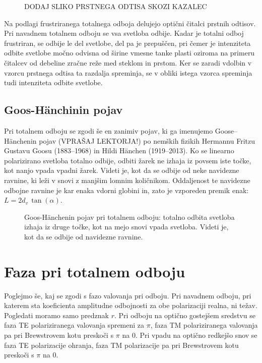 \begin{figure}[ht]
\centering
\caption{DODAJ SLIKO PRSTNEGA ODTISA SKOZI KAZALEC}
\label{fig:04_TunelFoto}
\end{figure}

\begin{remark}
Na podlagi frustriranega totalnega odboja delujejo optični čitalci prstnih odtisov. Pri 
navadnem totalnem odboju se vsa svetloba odbije. Kadar je totalni odboj frustriran, se 
odbije le del svetlobe, del pa je prepuščen, pri čemer je intenziteta odbite
svetlobe močno odvisna od širine vmesne tanke plasti oziroma na primeru čitalcev 
od debeline zračne reže med steklom in prstom. Ker se zaradi vdolbin v vzorcu prstnega odtisa
ta razdalja spreminja, se v obliki istega vzorca spreminja tudi intenziteta odbite svetlobe.
\end{remark} 

\subsection*{Goos-H\"anchinin pojav}
Pri totalnem odboju se zgodi še en zanimiv pojav, ki ga imenujemo Goose--H\"anchenin pojav 
(VPRAŠAJ LEKTORJA!) po nemških fizikih Hermannu Fritzu Gustavu Goosu (1883--1968) in Hildi
H\"anchen (1919--2013).
Ko se linearno polarizirano svetloba totalno odbije, odbiti žarek ne izhaja iz povsem iste točke, 
kot nanjo vpada vpadni žarek. Videti je, kot da se odbije od neke navidezne ravnine, ki leži v snovi
z manjšim lomnim količnikom. Oddaljenost te navidezne odbojne ravnine je kar enaka vdorni globini in, 
zato je vzporeden premik enak: $L = 2d_v\,\tan(\alpha)$.
\begin{figure}[ht]
\centering
\def\svgwidth{70truemm} 

\caption{Goos-H\"anchenin pojav pri totalnem odboju: totalno odbita svetloba izhaja iz druge točke, 
kot na mejo snovi vpada svetloba. Videti je, kot da se odbije od navidezne ravnine.}
\label{fig:04_Goos}
\end{figure}

\section{Faza pri totalnem odboju}
Poglejmo še, kaj se zgodi s fazo valovanja pri odboju. Pri navadnem odboju, pri katerem sta koeficienta
amplitudne odbojnosti za obe polarizaciji realna, ni težav. Pogledati moramo samo predznak $r$. Pri odboju na 
optično gostejšem sredstvu se faza TE polariziranega valovanja spremeni za $\pi$, faza TM polariziranega
valovanja pa pri Brewstrovem kotu preskoči s $\pi$ na 0. Pri vpadu na optično redkejšo snov se faza
TE polarizacije ohranja, faza TM polarizacije pa pri Brewstrovem kotu preskoči s $\pi$ na 0.  

